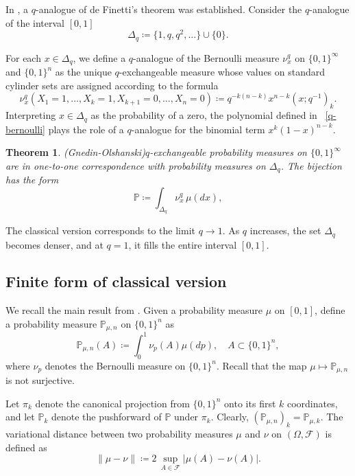 \documentclass[12pt, a4paper]{amsart}
\numberwithin{equation}{subsection}
\newtheorem{theorem}[equation]{Theorem}
\theoremstyle{definition}
\newcommand{\bP}{{\mathbb P}}
\begin{document}
\noindent In \cite{gnedin2009qanalogue}, a $q$-analogue of de Finetti's theorem was established. Consider the $q$-analogue of the interval $[0, 1]$ \[\Delta_{q} \coloneqq \{1, q, q^{2}, \ldots\} \cup \{0\}.\] 
 
\noindent
For each \( x \in \Delta_q \), we define a \( q \)-analogue of the Bernoulli measure $\nu^{q}_{x}$ on \( \{0,1\}^\infty \) and \( \{0,1\}^n \) as the unique $q$-exchangeable measure whose values on standard cylinder sets are assigned according to the formula
\begin{equation} \label{q-bernoulli}
    \nu^{q}_{x}(X_{1} = 1,\ldots,X_{k}=1,X_{k+1}=0,\ldots,X_{n}=0) \coloneqq q^{-k(n-k)} x^{n-k} (x; q^{-1})_{k}.
\end{equation}
Interpreting $x \in \Delta_{q}$ as the probability of a zero, the polynomial defined in ~\eqref{q-bernoulli} plays the role of a 
$q$-analogue for the binomial term $x^k (1 - x)^{n - k}$.
\begin{theorem}(Gnedin-Olshanski)\label{qversion_theorem}
$q$-exchangeable probability measures on $\{0, 1\}^{\infty}$ are in one-to-one correspondence with probability measures on $\Delta_{q}$. The bijection has the form
\begin{equation}
\label{qversion}
\mathbb{P}  \coloneqq \int_{\Delta_{q}}\nu^{q}_{x} \, \mu(dx),
\end{equation}
\end{theorem}
\noindent The classical version corresponds to the limit $q \to 1$. As $q$ increases, the set $\Delta_{q}$ becomes denser, and at $q =1$, it fills the entire interval $[0, 1]$.

\subsection{Finite form of classical version} We recall the main result from \cite{10.1214/aop/1176994663}. Given a probability measure $\mu$ on $[0,1]$, define a probability measure $\mathbb{P}_{\mu,n}$ on $\{0, 1\}^{n}$ as
\begin{equation}\label{finclintegral}
    \mathbb{P}_{\mu,n} (A) \coloneqq \int_{0}^{1} \nu_{p}(A) \mu(dp), \quad A \subset \{0,1\}^{n},
\end{equation}
 where $\nu_{p}$ denotes the Bernoulli measure on $\{0, 1\}^{n}.$ Recall that the map  
$\mu \mapsto \bP_{\mu,n}$
 is not surjective.

Let $\pi_k$ denote the canonical projection from $\{0,1\}^n$ onto its first $k$ coordinates, and let $\mathbb{P}_k$ denote the pushforward of $\mathbb{P}$ under $\pi_k$. Clearly, $(\mathbb{P}_{\mu,n})_k = \mathbb{P}_{\mu,k}$. The variational distance between two probability measures $\mu$ and $\nu$ on $(\Omega, \mathcal{F})$ is defined as
\begin{equation*}
\|\mu - \nu\| \coloneqq 2\, \sup\limits_{A \in \mathcal{F}} |\mu(A) - \nu(A)|.
\end{equation*}
\end{document}
